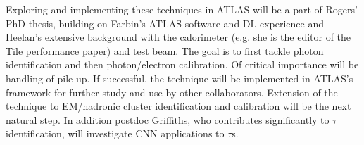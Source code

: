 
Exploring and implementing these techniques in ATLAS will be a part of
Rogers' PhD thesis, building on Farbin's ATLAS software and DL
experience and Heelan's extensive background with the calorimeter
(e.g. she is the editor of the Tile performance paper) and test
beam. The goal is to first tackle photon identification and then
photon/electron calibration. Of critical importance will be handling
of pile-up. If successful, the technique will be implemented in
ATLAS's framework for further study and use by other
collaborators. Extension of the technique to EM/hadronic cluster
identification and calibration will be the next natural step. In
addition postdoc Griffiths, who contributes significantly to $\tau$
identification, will investigate CNN applications to $\tau$s. %








